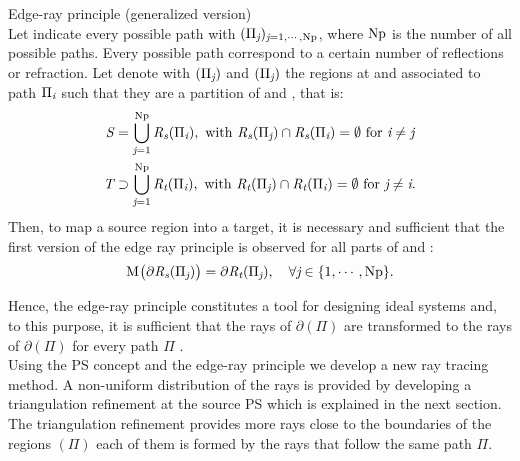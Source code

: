 \begin{lemma}{Edge-ray principle (generalized version)}\\
Let indicate every possible path with $(\Pi_{\textit{j}})_{\textit{j}=1, \cdots, \textrm{Np}}$, where $\textrm{Np}$ is the number of all possible paths.
Every possible path correspond to a certain number of reflections or refraction.
Let denote with $(\Pi_{\textit{j}})$ and $(\Pi_{\textit{j}})$ the regions at  and  associated to path $\Pi_{\textit{i}}$ such that they are a partition of  and , that is:
\begin{equation*}
\begin{aligned}
\mbox{$\emph{S}_{\textit{}}$} &= \bigcup_{\textit{j}=1}^{\textrm{Np}} \mbox{$\emph{R}_{\textit{\textrm{s}}}$}(\Pi_{\textit{i}}), \mbox{ with } \mbox{$\emph{R}_{\textit{\textrm{s}}}$}(\Pi_{\textit{j}})\cap \mbox{$\emph{R}_{\textit{\textrm{s}}}$}(\Pi_{\textit{i}}) = \emptyset \mbox{ for } \textit{i}\neq \textit{j}\\
\mbox{$\emph{T}_{\textit{}}$} & \supset \bigcup_{\textit{j}=1}^{\textrm{Np}} \mbox{$\emph{R}_{\textit{\textrm{t}}}$}(\Pi_{\textit{i}}), \mbox{ with } \mbox{$\emph{R}_{\textit{\textrm{t}}}$}(\Pi_{\textit{j}})\cap \mbox{$\emph{R}_{\textit{\textrm{t}}}$}(\Pi_{\textit{i}}) = \emptyset \mbox{ for } \textit{j}\neq \textit{i}.
\end{aligned}
\end{equation*} 
Then, to map a source region into a target, it is necessary and sufficient that the first version of the edge ray principle is observed for all parts of  and : 
\begin{equation*}
\mathrm{M}_{\textit{}}\big(\partial\mbox{$\emph{R}_{\textit{\textrm{s}}}$}(\Pi_{\textit{j}})\big) = \partial\mbox{$\emph{R}_{\textit{\textrm{t}}}$}(\Pi_{\textit{j}}), \quad \forall \textit{j}\in\{1, \cdots, \textrm{Np}\}.
\end{equation*}
\end{lemma}
Hence, the edge-ray principle constitutes a tool for designing ideal systems and, to this purpose, it is sufficient that the rays of $\partial$$(\Pi)$ are transformed to the rays of $\partial$$(\Pi)$ for every path $\Pi$ \cite{minano1992new}. 
\\ \indent Using the PS concept and the edge-ray principle we develop a new ray tracing method. 
A non-uniform distribution of the rays is provided by developing a triangulation refinement at the source PS which is explained in the next section. 
The triangulation refinement provides more rays close to the boundaries of the regions $(\Pi)$ each of them is formed by the rays that follow the same path $\Pi$.

